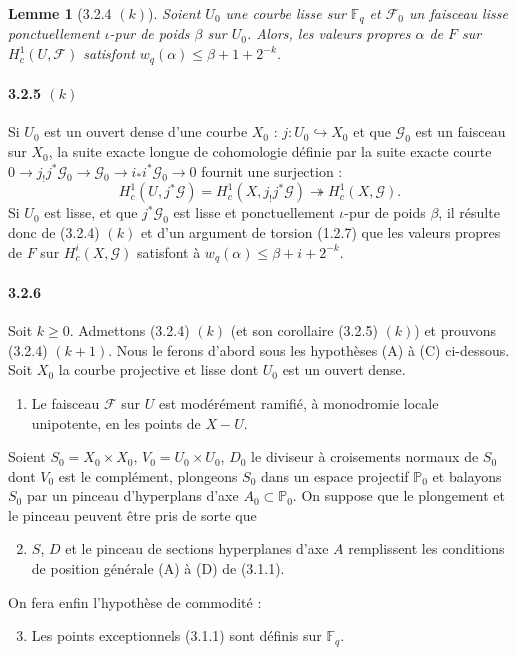 \documentclass[12pt,a4paper]{article}
\theoremstyle{plain}
\newtheorem{lemma}[theorem]{Lemme}
\theoremstyle{definition}
\theoremstyle{remark}
\newcommand{\FF}{{\mathbb{F}}}
\newcommand{\PP}{{\mathbb{P}}}
\begin{document}
\begin{lemma}[3.2.4 $(k)$]
Soient $U_0$ une courbe lisse sur $\FF_q$ et $\mathscr{F}_0$ un faisceau lisse ponctuellement $\iota$-pur de poids $\beta$ sur $U_0$. Alors, les valeurs propres $\alpha$ de $F$ sur $H_c^1(U, \mathscr{F})$ satisfont $w_q(\alpha) \leq \beta + 1 + 2^{-k}$.
\end{lemma}

\paragraph{3.2.5 $(k)$}
Si $U_0$ est un ouvert dense d'une courbe $X_0$ : $j : U_0 \hookrightarrow X_0$ et que $\mathscr{G}_0$ est un faisceau sur $X_0$, la suite exacte longue de cohomologie d\'efinie par la suite exacte courte $0 \to j_!j^*\mathscr{G}_0 \to \mathscr{G}_0 \to i_*i^*\mathscr{G}_0 \to 0$ fournit une surjection :
\[ H_c^1(U, j^*\mathscr{G}) = H_c^1(X, j_!j^*\mathscr{G}) \twoheadrightarrow H_c^1(X, \mathscr{G}). \]
Si $U_0$ est lisse, et que $j^*\mathscr{G}_0$ est lisse et ponctuellement $\iota$-pur de poids $\beta$, il r\'esulte donc de (3.2.4) $(k)$ et d'un argument de torsion (1.2.7) que les valeurs propres de $F$ sur $H_c^i(X, \mathscr{G})$ satisfont \`a $w_q(\alpha) \leq \beta + i + 2^{-k}$.


\paragraph{3.2.6}
Soit $k \geq 0$. Admettons (3.2.4) $(k)$ (et son corollaire (3.2.5) $(k)$) et prouvons (3.2.4) $(k+1)$. Nous le ferons d'abord sous les hypoth\`eses (A) \`a (C) ci-dessous. Soit $X_0$ la courbe projective et lisse dont $U_0$ est un ouvert dense.
\begin{enumerate}[label=(\Alph*)]
\item Le faisceau $\mathscr{F}$ sur $U$ est mod\'er\'ement ramifi\'e, \`a monodromie locale unipotente, en les points de $X - U$.
\end{enumerate}

Soient $S_0 = X_0 \times X_0$, $V_0 = U_0 \times U_0$, $D_0$ le diviseur \`a croisements normaux de $S_0$ dont $V_0$ est le compl\'ement, plongeons $S_0$ dans un espace projectif $\PP_0$ et balayons $S_0$ par un pinceau d'hyperplans d'axe $A_0 \subset \PP_0$. On suppose que le plongement et le pinceau peuvent \^etre pris de sorte que
\begin{enumerate}[label=(\Alph*)]
\setcounter{enumi}{1}
\item $S$, $D$ et le pinceau de sections hyperplanes d'axe $A$ remplissent les conditions de position g\'en\'erale (A) \`a (D) de (3.1.1).
\end{enumerate}
On fera enfin l'hypoth\`ese de commodit\'e :
\begin{enumerate}[label=(\Alph*)]
\setcounter{enumi}{2}
\item Les points exceptionnels (3.1.1) sont d\'efinis sur $\FF_q$.
\end{enumerate}
\end{document}
